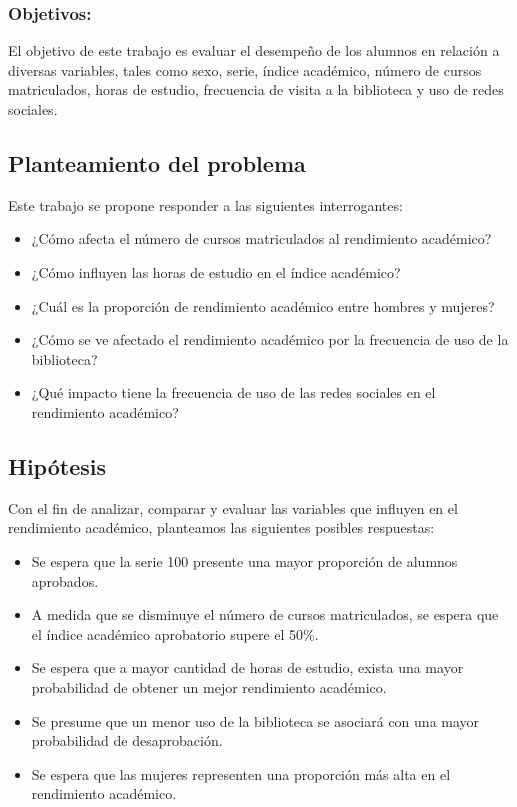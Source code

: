 \documentclass[
  letterpaper,
  DIV=11,
  numbers=noendperiod]{scrartcl}
\providecommand{\tightlist}{%
  \setlength{\itemsep}{0pt}\setlength{\parskip}{0pt}}\usepackage{longtable,booktabs,array}
\begin{document}
\hypertarget{objetivos}{%
\subsubsection{Objetivos:}\label{objetivos}}

El objetivo de este trabajo es evaluar el desempeño de los alumnos en
relación a diversas variables, tales como sexo, serie, índice académico,
número de cursos matriculados, horas de estudio, frecuencia de visita a
la biblioteca y uso de redes sociales.

\hypertarget{planteamiento-del-problema}{%
\subsection{Planteamiento del
problema}\label{planteamiento-del-problema}}

Este trabajo se propone responder a las siguientes interrogantes:

\begin{itemize}
\tightlist
\item
  ¿Cómo afecta el número de cursos matriculados al rendimiento
  académico?
\item
  ¿Cómo influyen las horas de estudio en el índice académico?
\item
  ¿Cuál es la proporción de rendimiento académico entre hombres y
  mujeres?
\item
  ¿Cómo se ve afectado el rendimiento académico por la frecuencia de uso
  de la biblioteca?
\item
  ¿Qué impacto tiene la frecuencia de uso de las redes sociales en el
  rendimiento académico?
\end{itemize}

\hypertarget{hipuxf3tesis}{%
\subsection{Hipótesis}\label{hipuxf3tesis}}

Con el fin de analizar, comparar y evaluar las variables que influyen en
el rendimiento académico, planteamos las siguientes posibles respuestas:

\begin{itemize}
\tightlist
\item
  Se espera que la serie 100 presente una mayor proporción de alumnos
  aprobados.
\item
  A medida que se disminuye el número de cursos matriculados, se espera
  que el índice académico aprobatorio supere el 50\%.
\item
  Se espera que a mayor cantidad de horas de estudio, exista una mayor
  probabilidad de obtener un mejor rendimiento académico.
\item
  Se presume que un menor uso de la biblioteca se asociará con una mayor
  probabilidad de desaprobación.
\item
  Se espera que las mujeres representen una proporción más alta en el
  rendimiento académico.
\end{itemize}
\end{document}
